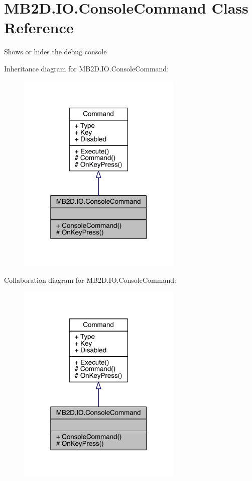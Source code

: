 \hypertarget{class_m_b2_d_1_1_i_o_1_1_console_command}{}\section{M\+B2\+D.\+I\+O.\+Console\+Command Class Reference}
\label{class_m_b2_d_1_1_i_o_1_1_console_command}


Shows or hides the debug console  




Inheritance diagram for M\+B2\+D.\+I\+O.\+Console\+Command\+:
\nopagebreak
\begin{figure}[H]
\begin{center}
\leavevmode
\includegraphics[width=223pt]{class_m_b2_d_1_1_i_o_1_1_console_command__inherit__graph}
\end{center}
\end{figure}


Collaboration diagram for M\+B2\+D.\+I\+O.\+Console\+Command\+:
\nopagebreak
\begin{figure}[H]
\begin{center}
\leavevmode
\includegraphics[width=223pt]{class_m_b2_d_1_1_i_o_1_1_console_command__coll__graph}
\end{center}
\end{figure}
